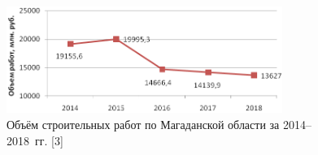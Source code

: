 \begin{figure}[H]

  \begin{center}
    \includegraphics[width=0.8\textwidth]{authors/serebryakova-fig-2.png}
  \end{center}

  \caption{Объём строительных работ по Магаданской области
за 2014--2018~гг. [3]}
  \label{fig:serebryakova-fig-2}
\end{figure}
